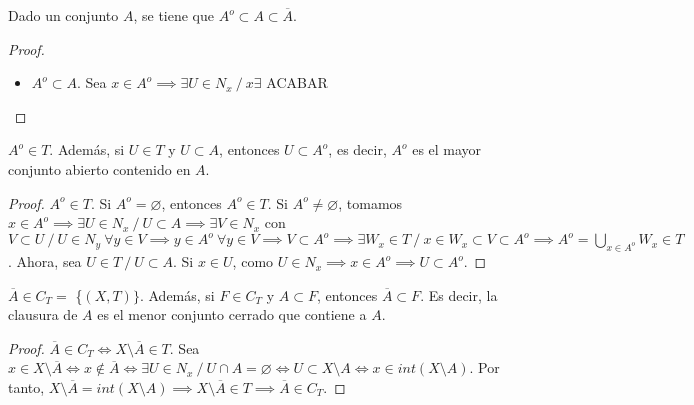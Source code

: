 \begin{properties}
  Dado un conjunto $A$, se tiene que $A^o \subset A \subset \overline{A}$.
\end{properties}
\begin{proof}
  \begin{itemize}
    \item $A^o \subset A$. Sea $x \in A^o \implies \exists U \in N_x\ /\ x \exists $ ACABAR
  \end{itemize}
\end{proof}
\begin{properties}
  $A^o \in T$. Además, si $U \in T$ y $U \subset A$, entonces $U \subset A^o$, es decir, $A^o$ es el mayor conjunto abierto contenido en $A$.
\end{properties}
\begin{proof}
  $A^o \in T$. Si $A^o = \varnothing $, entonces $A^o \in T$. Si $A^o \neq \varnothing $, tomamos $x \in A^o \implies \exists U \in N_{x}\ /\ U \subset A \implies \exists V \in N_x$ con $V \subset U\ /\ U \in N_y \ \forall y \in V \implies y \in A^o \ \forall y \in V \implies V \subset A^o \implies \exists W_x \in T \ /\ x \in W_x \subset V \subset A^o \implies A^o = \bigcup_{x \in A^o} W_x \in T$. Ahora, sea $U \in T\ /\ U \subset A$. Si $x \in U$, como $U \in N_x \implies x \in A^o \implies U \subset A^o$.
\end{proof}

\begin{properties}
  $\overline{A} \in C_T =$ \{$(X,T)\}$. Además, si $F \in C_T$ y $A \subset F$, entonces $\overline{A} \subset F$. Es decir, la clausura de $A$ es el menor conjunto cerrado que contiene a $A$.
\end{properties}
\begin{proof}
  $\overline{A} \in C_T \Leftrightarrow X \setminus \overline{A} \in T$. Sea $x \in X \setminus \overline{A} \Leftrightarrow x \not\in \overline{A} \Leftrightarrow \exists U \in N_x\ /\ U \cap A = \varnothing \Leftrightarrow U \subset X \setminus A \Leftrightarrow x \in int(X \setminus A)$. Por tanto, $X \setminus \overline{A} = int(X \setminus A) \implies X \setminus \overline{A} \in T \implies \overline{A} \in C_T$.
\end{proof}

